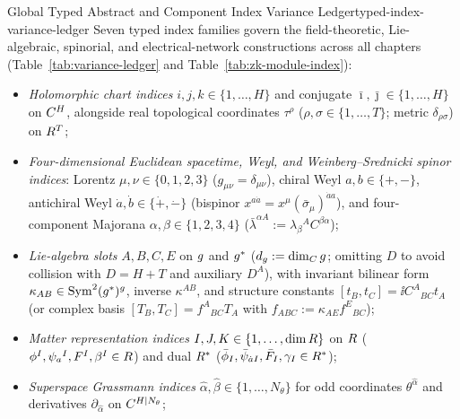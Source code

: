 \begin{zkmodule}{Global Typed Abstract and Component Index Variance Ledger}{typed-index-variance-ledger}
Seven typed index families govern the field-theoretic, Lie-algebraic, spinorial, and electrical-network constructions across all chapters (Table~\ref{tab:variance-ledger} and Table~\ref{tab:zk-module-index}):
\begin{itemize}[leftmargin=*]
  \item \emph{Holomorphic chart indices} $i,j,k \in \{1,\dots,H\}$ and conjugate $\bar{\imath},\bar{\jmath} \in \{1,\dots,H\}$ on $C^H$, alongside real topological coordinates $\tau^\rho$ ($\rho,\sigma \in \{1,\dots,T\}$; metric $\delta_{\rho\sigma}$) on $R^T$;
  \item \emph{Four-dimensional Euclidean spacetime, Weyl, and Weinberg--Srednicki spinor indices}: Lorentz $\mu,\nu \in \{0,1,2,3\}$ ($g_{\mu\nu} = \delta_{\mu\nu}$), chiral Weyl $a,b \in \{+,-\}$, antichiral Weyl $\dot{a},\dot{b} \in \{\dot{+},\dot{-}\}$ (bispinor $x^{a\dot{a}} = x^\mu(\bar{\sigma}_\mu)^{\dot{a}a}$), and four-component Majorana $\alpha,\beta \in \{1,2,3,4\}$ ($\bar{\lambda}^{\alpha A} := \lambda_\beta{}^A C^{\beta\alpha}$);
  \item \emph{Lie-algebra slots} $A,B,C,E$ on $g$ and $g^*$ ($d_{g} := \dim_{C}g$; omitting $D$ to avoid collision with $D = H+T$ and auxiliary $D^A$), with invariant bilinear form $\kappa_{AB} \in \operatorname{Sym}^2(g^*)^{g}$, inverse $\kappa^{AB}$, and structure constants $[t_B, t_C] = \ii C^A{}_{BC}t_A$ (or complex basis $[T_B, T_C] = f^A{}_{BC}T_A$ with $f_{ABC} := \kappa_{AE}f^E{}_{BC}$);
  \item \emph{Matter representation indices} $I,J,K \in \{1,\dots,\dim R\}$ on $R$ ($\phi^I, \psi_a{}^I, F^I, \beta^I \in R$) and dual $R^*$ ($\bar{\phi}_I, \bar{\psi}_{\dot{a}I}, \bar{F}_I, \gamma_I \in R^*$);
  \item \emph{Superspace Grassmann indices} $\hat{\alpha},\hat{\beta} \in \{1,\dots,N_{\theta}\}$ for odd coordinates $\theta^{\hat{\alpha}}$ and derivatives $\partial_{\hat{\alpha}}$ on $C^{H|N_{\theta}}$;

\end{itemize}
\end{zkmodule}
